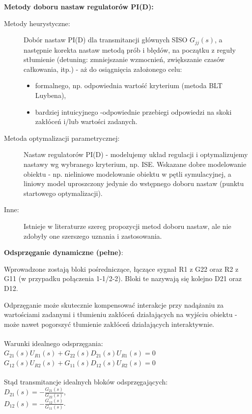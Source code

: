 \textbf{Metody doboru nastaw regulatorów PI(D):}
\begin{description}
    \item[Metody heurystyczne:] Dobór nastaw PI(D) dla transmitancji głównych SISO $G_{jj}(s)$, a następnie korekta nastaw metodą prób i błędów, na początku z reguły stłumienie (detuning: zmniejszanie wzmocnień, zwiększanie czasów całkowania, itp.) - aż do osiągnięcia założonego celu:\mbox{}
    \begin{itemize}
        \item formalnego, np. odpowiednia wartość kryterium (metoda BLT Luybena),
        \item bardziej intuicyjnego -odpowiednie przebiegi odpowiedzi na skoki zakłóceń i/lub wartości zadanych.
    \end{itemize}
    \item[Metoda optymalizacji parametrycznej:] Nastaw regulatorów PI(D) - modelujemy układ regulacji i optymalizujemy nastawy wg wybranego kryterium, np. ISE. Wskazane dobre modelowanie obiektu - np. nieliniowe modelowanie obiektu w pętli symulacyjnej, a liniowy model uproszczony jedynie do wstępnego doboru nastaw (punktu startowego optymalizacji).
    \item[Inne:] Istnieje w literaturze szereg propozycji metod doboru nastaw, ale nie zdobyły one szerszego uznania i zastosowania.
\end{description}

\textbf{Odsprzęganie dynamiczne (pełne)}:

Wprowadzone zostają bloki pośredniczące, łączące sygnał R1 z G22 oraz R2 z G11 (w przypadku połączenia 1-1/2-2). Bloki te nazywają się kolejno D21 oraz D12.

Odprzęganie może skutecznie kompensować interakcje przy nadążaniu za wartościami zadanymi i tłumieniu zakłóceń działających na wyjściu obiektu - może nawet pogorszyć tłumienie zakłóceń działających interaktywnie.
\\\\

Warunki idealnego odsprzęgania:\mbox{}\\
$G_{21}(s)U_{R1}(s)+G_{22}(s)D_{21}(s)U_{R1}(s)=0$\\
$G_{12}(s)U_{R2}(s)+G_{11}(s)D_{12}(s)U_{R2}(s)=0$
\\\\

Stąd transmitancje idealnych bloków odsprzęgających:\\
$D_{21}(s)=-\frac{G_{21}(s)}{G_{22}(s)}$,\\
$D_{12}(s)=-\frac{G_{12}(s)}{G_{11}(s)}$.

